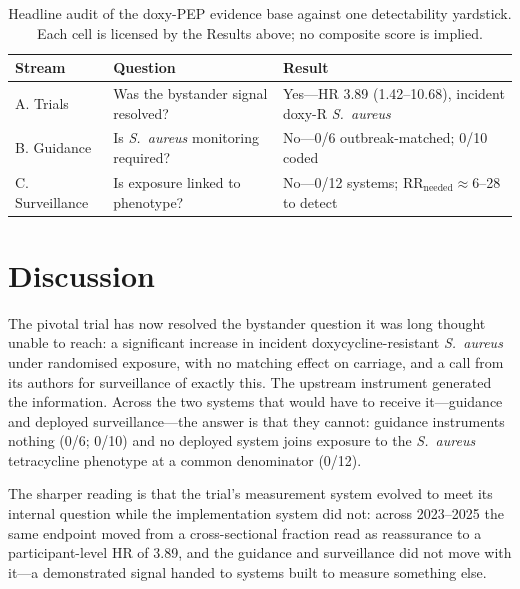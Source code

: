 \documentclass[12pt,a4paper]{article}
\newcommand{\sa}{\emph{S.~aureus}}
\begin{document}
\begin{table}[t]
\centering
\caption{Headline audit of the doxy-PEP evidence base against one detectability
yardstick. Each cell is licensed by the Results above; no composite score is
implied.}
\label{tab:audit}
\small
\begin{tabularx}{\textwidth}{@{}lXl@{}}
\toprule
Stream & Question & Result\\
\midrule
A. Trials & Was the bystander signal resolved? & Yes---HR 3.89 (1.42--10.68), incident doxy-R \sa{}\\
B. Guidance & Is \sa{} monitoring required? & No---0/6 outbreak-matched; 0/10 coded\\
C. Surveillance & Is exposure linked to phenotype? & No---0/12 systems; RR$_{\text{needed}}\approx$6--28 to detect\\
\bottomrule
\end{tabularx}
\end{table}

\section*{Discussion}

The pivotal trial has now resolved the bystander question it was long thought
unable to reach: a significant increase in incident doxycycline-resistant \sa{}
under randomised exposure, with no matching effect on carriage, and a call from
its authors for surveillance of exactly this.\cite{luetkemeyer2025} The upstream
instrument generated the information. Across the two systems that would have to
receive it---guidance and deployed surveillance---the answer is that they cannot:
guidance instruments nothing (0/6; 0/10) and no deployed system joins exposure to
the \sa{} tetracycline phenotype at a common denominator (0/12).

The sharper reading is that the trial's measurement system evolved to meet its
internal question while the implementation system did not: across 2023--2025 the
same endpoint moved from a cross-sectional fraction read as reassurance to a
participant-level HR of 3.89, and the guidance and surveillance did not move with
it\cite{montoya2025estimand}---a demonstrated signal handed to systems built to
measure something else.
\end{document}
